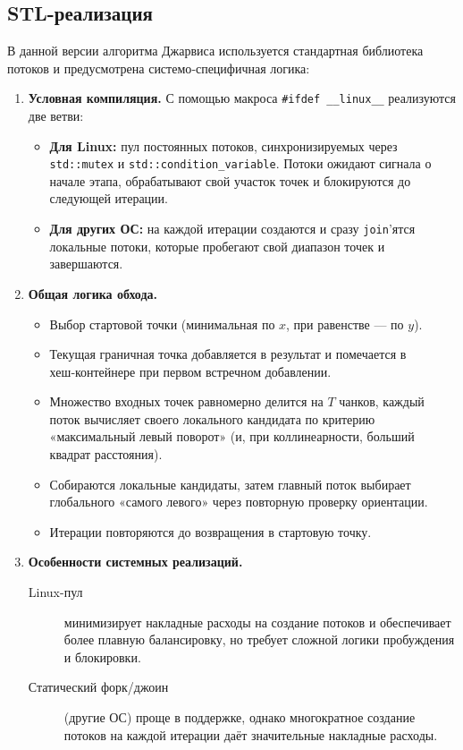 \documentclass[12pt,a4paper]{article}
\begin{document}
\subsection*{STL-реализация}

В данной версии алгоритма Джарвиса используется стандартная библиотека потоков и предусмотрена системо‑специфичная логика:

\begin{enumerate}
  \item \textbf{Условная компиляция.}  
    С помощью макроса \texttt{\#ifdef \_\_linux\_\_} реализуются две ветви:
    \begin{itemize}
      \item \textbf{Для Linux:} пул постоянных потоков, синхронизируемых через \texttt{std::mutex} и \texttt{std::condition\_variable}. Потоки ожидают сигнала о начале этапа, обрабатывают свой участок точек и блокируются до следующей итерации.
      \item \textbf{Для других ОС:} на каждой итерации создаются и сразу \texttt{join}’ятся локальные потоки, которые пробегают свой диапазон точек и завершаются.
    \end{itemize}

  \item \textbf{Общая логика обхода.}  
    \begin{itemize}
      \item Выбор стартовой точки (минимальная по \(x\), при равенстве — по \(y\)).
      \item Текущая граничная точка добавляется в результат и помечается в хеш‑контейнере при первом встречном добавлении.
      \item Множество входных точек равномерно делится на \(T\) чанков, каждый поток вычисляет своего локального кандидата по критерию «максимальный левый поворот» (и, при коллинеарности, больший квадрат расстояния).
      \item Собираются локальные кандидаты, затем главный поток выбирает глобального «самого левого» через повторную проверку ориентации.
      \item Итерации повторяются до возвращения в стартовую точку.
    \end{itemize}

  \item \textbf{Особенности системных реализаций.}  
    \begin{description}
      \item[Linux-пул] минимизирует накладные расходы на создание потоков и обеспечивает более плавную балансировку, но требует сложной логики пробуждения и блокировки.
      \item[Статический форк/джоин] (другие ОС) проще в поддержке, однако многократное создание потоков на каждой итерации даёт значительные накладные расходы.
    \end{description}


\end{enumerate}
\end{document}
